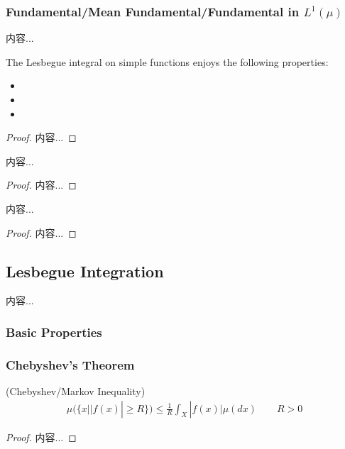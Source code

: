 \documentclass[Total.tex]{subfiles}
\begin{document}
			\subsubsection{Fundamental/Mean Fundamental/Fundamental in $L^1(\mu)$}
			\begin{Def}
				内容...
			\end{Def}
			
			\begin{lemma}
				The Lesbegue integral on simple functions enjoys the following properties:
				\begin{itemize}
					\item 
					\item 
					\item 
				\end{itemize}
			\end{lemma}
			\begin{proof}
				内容...
			\end{proof}
			
			\begin{corollary}
				内容...
			\end{corollary}
			\begin{proof}
				内容...
			\end{proof}
			
			\begin{proposition}
				内容...
			\end{proposition}
			\begin{proof}
				内容...
			\end{proof}
			
			\subsection{Lesbegue Integration}
			
			\begin{Def}
				内容...
			\end{Def}
			
			
			\subsubsection{Basic Properties}
			
			\subsubsection{Chebyshev's Theorem}
			
			\begin{theorem}
				(Chebyshev/Markov Inequality) 
				\begin{gather*}
					\mu(\{x||f(x)|\geq R\})\leq \frac{1}{R}\int_X |f(x)|\mu(dx)\qquad R>0
				\end{gather*}
			\end{theorem}
			\begin{proof}
				内容...
			\end{proof}
			
\end{document}

